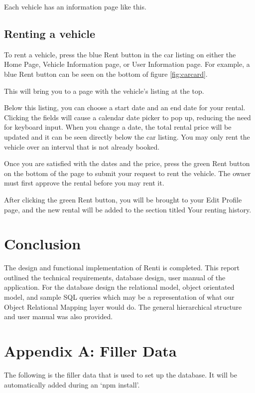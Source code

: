 \documentclass{article}
\begin{document}
Each vehicle has an information page like this.

\subsection{Renting a vehicle}
To rent a vehicle, press the blue Rent button in the car listing on either the Home Page, Vehicle Information page, or User Information page. For example, a blue Rent button can be seen on the bottom of figure \ref{fig:carcard}.

This will bring you to a page with the vehicle's listing at the top.

Below this listing, you can choose a start date and an end date for your rental. Clicking the fields will cause a calendar date picker to pop up, reducing the need for keyboard input. When you change a date, the total rental price will be updated and it can be seen directly below the car listing. You may only rent the vehicle over an interval that is not already booked.

Once you are satisfied with the dates and the price, press the green Rent button on the bottom of the page to submit your request to rent the vehicle. The owner must first approve the rental before you may rent it.

After clicking the green Rent button, you will be brought to your Edit Profile page, and the new rental will be added to the section titled Your renting history.

\section{Conclusion}
The design and functional implementation of Renti is completed. This report outlined the technical requirements, database design, user manual of the application. For the database design the relational model, object orientated model, and sample SQL queries which may be a representation of what our Object Relational Mapping layer would do. The general hierarchical structure and user manual was also provided.

\section{Appendix A: Filler Data}
The following is the filler data that is used to set up the database. It will be automatically added during an `npm install'.

\end{document}

